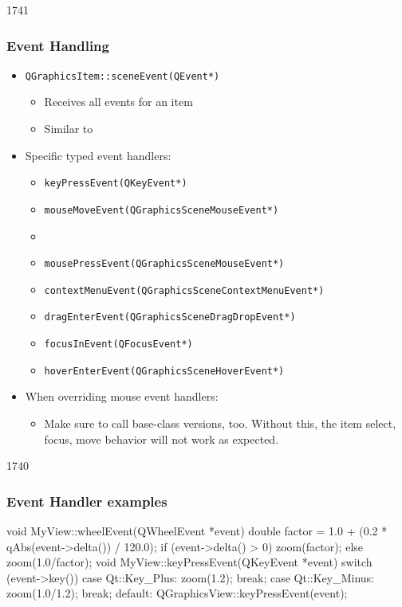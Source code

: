 \begin{slide}{1741}

\frametitle{Event Handling}
\begin{itemize}
\item \texttt{QGraphicsItem::sceneEvent(QEvent*)}
    \begin{itemize}
    \item Receives all events for an item
    \item Similar to 

    \end{itemize} 
\item Specific typed event handlers:
    \begin{itemize}
    \item \texttt{keyPressEvent(QKeyEvent*)}
    \item \texttt{mouseMoveEvent(QGraphicsSceneMouseEvent*)}
    \item {}
    \item \texttt{mousePressEvent(QGraphicsSceneMouseEvent*)}
    \item \texttt{contextMenuEvent(QGraphicsSceneContextMenuEvent*)}
    \item \texttt{dragEnterEvent(QGraphicsSceneDragDropEvent*)}
    \item \texttt{focusInEvent(QFocusEvent*)}
    \item \texttt{hoverEnterEvent(QGraphicsSceneHoverEvent*)}
    \end{itemize}

\item When overriding mouse event handlers:
  \begin{itemize}
     \item Make sure to call base-class versions, too. Without this, the item select, focus, move behavior will not work as expected.
   \end{itemize}
\end{itemize}
\end{slide}


\begin{slide}[fragile]{1740}


\frametitle{Event Handler examples}
\begin{cpp}
void MyView::wheelEvent(QWheelEvent *event) {
    double factor =
        1.0 + (0.2 * qAbs(event->delta()) / 120.0);
    if (event->delta() > 0) zoom(factor);
    else                    zoom(1.0/factor);
}
void MyView::keyPressEvent(QKeyEvent *event) {
    switch (event->key()) {
      case Qt::Key_Plus:
          zoom(1.2);
          break;
      case Qt::Key_Minus:
          zoom(1.0/1.2);
          break;
      default:
          QGraphicsView::keyPressEvent(event);
    }
}
\end{cpp}

\end{slide}



